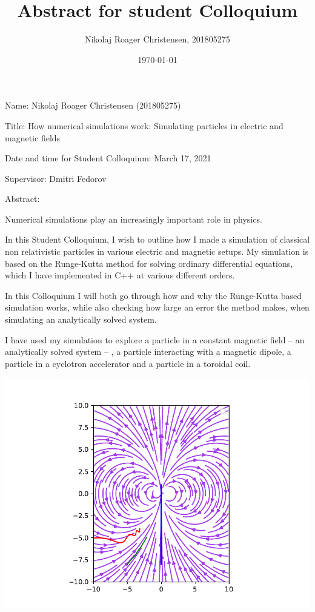 \documentclass[a4paper,12pt,article]{memoir}
\title{Abstract for student Colloquium}
\author{Nikolaj Roager Christensen, 201805275}
\date{\today} %
\begin{document}
\maketitle


\noindent Name: Nikolaj Roager Christensen (201805275)

\noindent Title: How numerical simulations work: Simulating particles in electric and magnetic fields

\noindent Date and time for Student Colloquium: March 17, 2021

\noindent Supervisor: Dmitri Fedorov


\noindent Abstract:

Numerical simulations play an increasingly important role in physics.

In this Student Colloquium, I wish to outline how I made a simulation of classical non relativistic particles in various electric and magnetic setups. My simulation is based on the Runge-Kutta method for solving ordinary differential equations, which I have implemented in C++ at various different orders.

In this Colloquium I will both go through how and why the Runge-Kutta based simulation works, while also checking how large an error the method makes, when simulating an analytically solved system.

I have used my simulation to explore a particle in a constant magnetic field -- an analytically solved system -- , a particle interacting with a magnetic dipole, a particle in a cyclotron accelerator and a particle in a toroidal coil.

\begin{center}
\includegraphics[width=0.8\linewidth]{dipole1.pdf}


\end{center}
\end{document}
